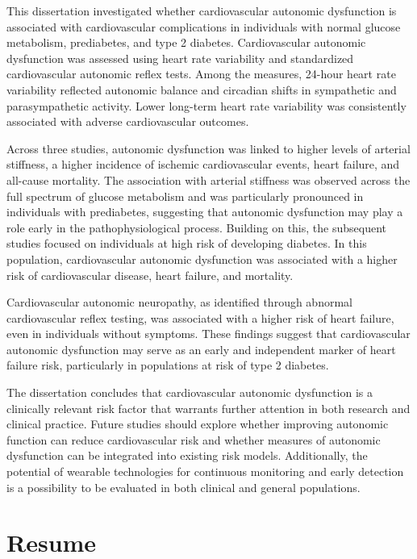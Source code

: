 \documentclass[
  letterpaper,
  headsepline=true,
  open=any]{scrbook}
\begin{document}

This dissertation investigated whether cardiovascular autonomic
dysfunction is associated with cardiovascular complications in
individuals with normal glucose metabolism, prediabetes, and type 2
diabetes. Cardiovascular autonomic dysfunction was assessed using heart
rate variability and standardized cardiovascular autonomic reflex tests.
Among the measures, 24-hour heart rate variability reflected autonomic
balance and circadian shifts in sympathetic and parasympathetic
activity. Lower long-term heart rate variability was consistently
associated with adverse cardiovascular outcomes.

Across three studies, autonomic dysfunction was linked to higher levels
of arterial stiffness, a higher incidence of ischemic cardiovascular
events, heart failure, and all-cause mortality. The association with
arterial stiffness was observed across the full spectrum of glucose
metabolism and was particularly pronounced in individuals with
prediabetes, suggesting that autonomic dysfunction may play a role early
in the pathophysiological process. Building on this, the subsequent
studies focused on individuals at high risk of developing diabetes. In
this population, cardiovascular autonomic dysfunction was associated
with a higher risk of cardiovascular disease, heart failure, and
mortality.

Cardiovascular autonomic neuropathy, as identified through abnormal
cardiovascular reflex testing, was associated with a higher risk of
heart failure, even in individuals without symptoms. These findings
suggest that cardiovascular autonomic dysfunction may serve as an early
and independent marker of heart failure risk, particularly in
populations at risk of type 2 diabetes.

The dissertation concludes that cardiovascular autonomic dysfunction is
a clinically relevant risk factor that warrants further attention in
both research and clinical practice. Future studies should explore
whether improving autonomic function can reduce cardiovascular risk and
whether measures of autonomic dysfunction can be integrated into
existing risk models. Additionally, the potential of wearable
technologies for continuous monitoring and early detection is a
possibility to be evaluated in both clinical and general populations.

\newpage


\hypertarget{resume}{%
\chapter*{Resume}\label{resume}}
\end{document}
